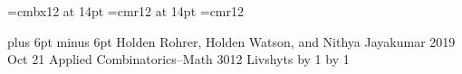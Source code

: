 \font\fourteenbf=cmbx12 at 14pt
\font\fourteenrm=cmr12 at 14pt
\font\twelverm=cmr12

\newskip\megskipamount \megskipamount=18pt plus 6pt minus 6pt
\def\megskip{\vskip\megskipamount}
{\obeylines\parindent=0in
Holden Rohrer, Holden Watson, and Nithya Jayakumar
2019 Oct 21
Applied Combinatorics--Math 3012
Livshyts
\medskip
}
\def\titlesub#1#2{\centerline{\fourteenbf #1}\centerline{#2}\megskip}
\newcount\sections \newcount\subsections
\outer\def\section#1\par{\advance\sections by 1}
\def\thesection#1{\vskip .3\hsize\goodbreak\vskip -.3\hsize\noindent{\fourteenrm\the\sections\ #1\bigskip}}
\outer\def\subsection#1\par{\advance\subsections by 1}
\def\thesubsection#1{\vskip .15\hsize\goodbreak\vskip -.15\hsize\noindent{\twelverm\the\sections.\the\subsections\ #1\medskip}}
